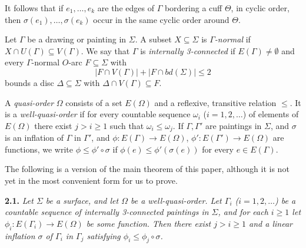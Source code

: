 It follows that if $e_1, \dots, e_k$ are the edges of $\Gamma$ bordering a cuff $\Theta$, in cyclic order, then $\sigma(e_1), \dots, \sigma(e_k)$ occur in the same cyclic order around $\Theta$.

Let $\Gamma$ be a drawing or painting in $\Sigma$. A subset $X \subseteq \Sigma$ is \textit{$\Gamma$-normal} if $X \cap U(\Gamma) \subseteq V(\Gamma)$. We say that $\Gamma$ is \textit{internally 3-connected} if $E(\Gamma) \ne \emptyset$ and every $\Gamma$-normal $O$-arc $F \subseteq \Sigma$ with
\begin{equation*}
|F \cap V(\Gamma)| + |F \cap bd(\Sigma)| \le 2
\end{equation*}
bounds a disc $\Delta \subseteq \Sigma$ with $\Delta \cap V(\Gamma) \subseteq F$.

A \textit{quasi-order} $\Omega$ consists of a set $E(\Omega)$ and a reflexive, transitive relation $\le$. It is a \textit{well-quasi-order} if for every countable sequence $\omega_i$ ($i = 1, 2, \dots$) of elements of $E(\Omega)$ there exist $j > i \ge 1$ such that $\omega_i \le \omega_j$. If $\Gamma, \Gamma'$ are paintings in $\Sigma$, and $\sigma$ is an inflation of $\Gamma$ in $\Gamma'$, and $\phi \colon E(\Gamma) \to E(\Omega)$, $\phi' \colon E(\Gamma') \to E(\Omega)$ are functions, we write $\phi \le \phi' \circ \sigma$ if $\phi(e) \le \phi'(\sigma(e))$ for every $e \in E(\Gamma)$.

The following is a version of the main theorem of this paper, although it is not yet in the most convenient form for us to prove.

\textbf{2.1.} \textit{Let $\Sigma$ be a surface, and let $\Omega$ be a well-quasi-order. Let $\Gamma_i$ ($i = 1, 2, \dots$) be a countable sequence of internally 3-connected paintings in $\Sigma$, and for each $i \ge 1$ let $\phi_i \colon E(\Gamma_i) \to E(\Omega)$ be some function. Then there exist $j > i \ge 1$ and a linear inflation $\sigma$ of $\Gamma_i$ in $\Gamma_j$ satisfying $\phi_i \le \phi_j \circ \sigma$.}
